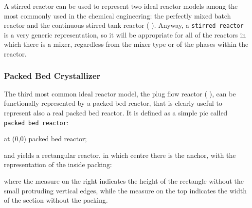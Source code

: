 \documentclass[12pt]{article}						%
\newcommand*{\ac}[1]{%
		\textsmaller{#1}%
	}
\newcommand*{\chpn}[1]{\texttt{#1}}				%
\newcommand*{\chpp}[1]{\texttt{#1}}				%
\begin{document}
A stirred reactor can be used to represent two ideal reactor models among the
most commonly used in the chemical engineering: the perfectly mixed batch reactor
and the continuous stirred tank reactor (\ac{CSTR}). Anyway, a
\chpp{stirred reactor} is a very generic representation, so it will be
appropriate for all of the reactors in which there is a mixer, regardless from
the mixer type or of the phases within the reactor.

\subsubsection{Packed Bed Crystallizer}

The third most common ideal reactor model, the plug flow reactor (\ac{PFR}), can
be functionally represented by a packed bed reactor, that is clearly useful to
represent also a real packed bed reactor. It is defined as a simple pic called
\chpp{packed bed reactor}:
\begin{chpcode}
	\pic at (0,0) {packed bed reactor};
\end{chpcode}
and yields a rectangular reactor, in which centre there is the anchor, with the
representation of the inside packing:
\begin{center}
\end{center}
where the measure on the right indicates the height of the rectangle without the
small protruding vertical edges, while the measure on the top indicates the width
of the section without the packing.
\end{document}
